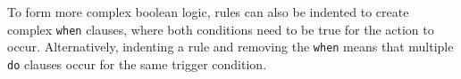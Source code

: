 \documentclass[conference]{IEEEtran}
\newcommand{\todo}[1]{\textbf{#1}}
\begin{document}
To form more complex boolean logic, rules can also be indented to create complex {\tt when} clauses, where both conditions need to be true for the action to occur. Alternatively, indenting a rule and removing the {\tt when} means that multiple {\tt do} clauses occur for the same trigger condition. 




\end{document}
